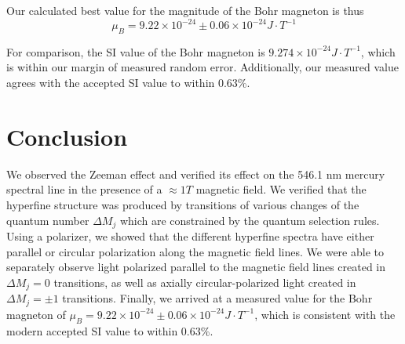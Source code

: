 \documentclass[twocolumn]{article}
\begin{document}
		Our calculated best value for the magnitude of the Bohr magneton is thus 
		\begin{equation}
			\mu_B = 9.22\times10^{-24}\pm 0.06\times10^{-24} J\cdot T^{-1}
		\end{equation}
		
		For comparison, the SI value of the Bohr magneton is $9.274\times10^{-24} J\cdot T^{-1}$\cite{_codata_????}, which is within our margin of measured random error.
		Additionally, our measured value agrees with the accepted SI value to within 0.63\%.
		

\section{Conclusion} \label{sec:Conclusion}
	We observed the Zeeman  effect and verified its effect on the 546.1 nm mercury spectral line in the presence of a $\approx1T$ magnetic field.
	We verified that the hyperfine structure was produced by transitions of various changes of the quantum number $\Delta M_j$ which are constrained by the quantum selection rules.
	Using a polarizer, we showed that the different hyperfine spectra have either parallel or circular polarization along the magnetic field lines.
	We were able to separately observe light polarized parallel to the magnetic field lines created in $\Delta M_j = 0$ transitions, as well as axially circular-polarized light created in $\Delta M_j = \pm1$ transitions.
	Finally, we arrived at a measured value for the Bohr magneton of $\mu_B = 9.22\times10^{-24}\pm 0.06\times10^{-24} J\cdot T^{-1}$, which is consistent with the modern accepted SI value to within 0.63\%.


\end{document}
